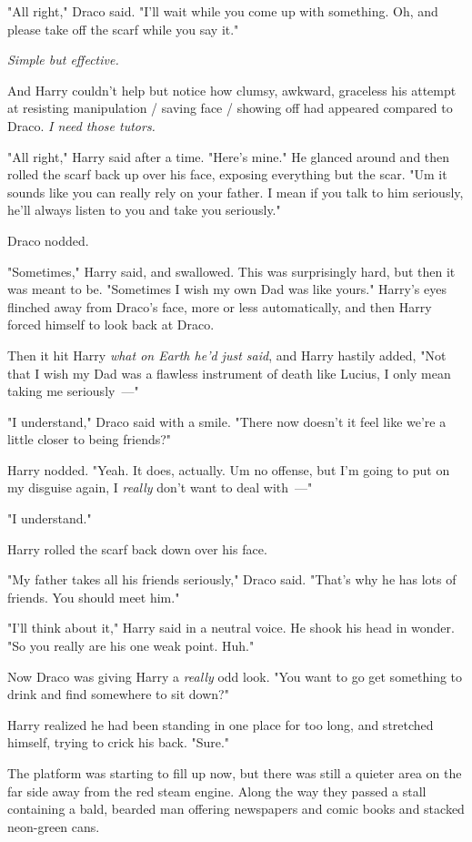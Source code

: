 "All right," Draco said. "I'll wait while you come up with something. Oh, and
please take off the scarf while you say it."

\emph{Simple but effective.}

And Harry couldn't help but notice how clumsy, awkward, graceless his attempt
at resisting manipulation / saving face / showing off had appeared compared to
Draco. \emph{I need those tutors.}

"All right," Harry said after a time. "Here's mine." He glanced around and then
rolled the scarf back up over his face, exposing everything but the scar.
"Um{\el} it sounds like you can really rely on your father. I mean{\el}
if you talk to him seriously, he'll always listen to you and take you
seriously."

Draco nodded.

"Sometimes," Harry said, and swallowed. This was surprisingly hard, but then it
was meant to be. "Sometimes I wish my own Dad was like yours." Harry's eyes
flinched away from Draco's face, more or less automatically, and then Harry
forced himself to look back at Draco.

Then it hit Harry \emph{what on Earth he'd just said}, and Harry hastily added,
"Not that I wish my Dad was a flawless instrument of death like Lucius, I only
mean taking me seriously~---"

"I understand," Draco said with a smile. "There{\el} now doesn't it feel
like we're a little closer to being friends?"

Harry nodded. "Yeah. It does, actually. Um{\el} no offense, but I'm going to
put on my disguise again, I \emph{really} don't want to deal with~---"

"I understand."

Harry rolled the scarf back down over his face.

"My father takes all his friends seriously," Draco said. "That's why he has
lots of friends. You should meet him."

"I'll think about it," Harry said in a neutral voice. He shook his head in
wonder. "So you really are his one weak point. Huh."

Now Draco was giving Harry a \emph{really} odd look. "You want to go get
something to drink and find somewhere to sit down?"

Harry realized he had been standing in one place for too long, and stretched
himself, trying to crick his back. "Sure."

The platform was starting to fill up now, but there was still a quieter area on
the far side away from the red steam engine. Along the way they passed a stall
containing a bald, bearded man offering newspapers and comic books and stacked
neon-green cans.

